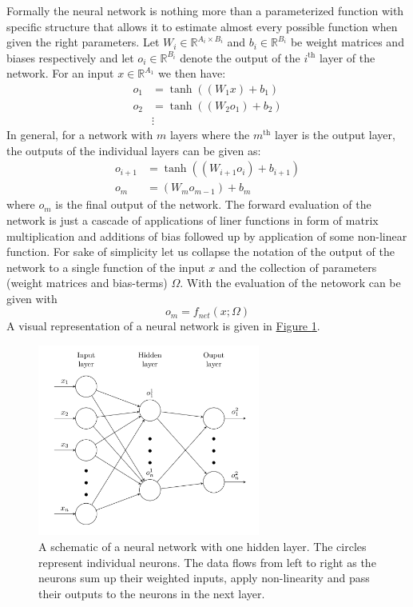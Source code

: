 \documentclass[12pt,a4paper,twoside]{scrartcl}
\numberwithin{equation}{section}
\newcommand{\reffig}[1]{\hyperref[#1]{Figure \ref*{#1}}}
\begin{document}
Formally the neural network is nothing more than a parameterized function with specific structure that allows it to estimate almost every possible function when given the right parameters. Let \(W_i \in \mathbb{R}^{A_i \times B_i }\) and \(b_i\in\mathbb{R}^{B_i}\) be weight matrices and biases respectively and let \(o_i\in\mathbb{R}^{B_i}\) denote the output of the \(i^\text{th}\) layer of the network. For an input \(x\in \mathbb{R}^{A_1}\) we then have:
\begin{align}
  o_{1} &= \tanh((W_{1}x) + b_{1}) \\
  o_{2} &= \tanh((W_{2}o_1) + b_{2}) \\
        &\vdots
\end{align}
In general, for a network with \(m\) layers where the \(m^{\text{th}}\) layer is the output layer, the outputs of the individual layers can be given as:
\begin{align}
  \label{eq:nn-ouput}
  o_{i+1}  &= \tanh((W_{i+1}o_i) + b_{i+1}) \\
  o_m     &= (W_{m}o_{m-1}) + b_{m}
\end{align}
where \(o_m \) is the final output of the network. The forward evaluation of the network is just a cascade of applications of liner functions in form of matrix multiplication and additions of bias followed up by application of some non-linear function. For sake of simplicity let us collapse the notation of the output of the network to a single function of the input \(x\) and the collection of parameters (weight matrices and bias-terms) \(\Omega\). With the evaluation of the netowork can be given with
\begin{equation}
  o_m = f_{net}(x; \Omega)
\end{equation}
A visual representation of a neural network is given in \reffig{fig:nn}.
\begin{center}
  \begin{figure}[H]
    \centering
    \includegraphics[height=0.65\textwidth, width=0.65\textwidth]{figures/nn.png}
    \caption[Neural Network Schematic]{A schematic of a neural network with one hidden layer. The circles represent individual neurons. The data flows from left to right as the neurons sum up their weighted inputs, apply non-linearity and pass their outputs to the neurons in the next layer.}\label{fig:nn}
  \end{figure}
\end{center}
\end{document}

